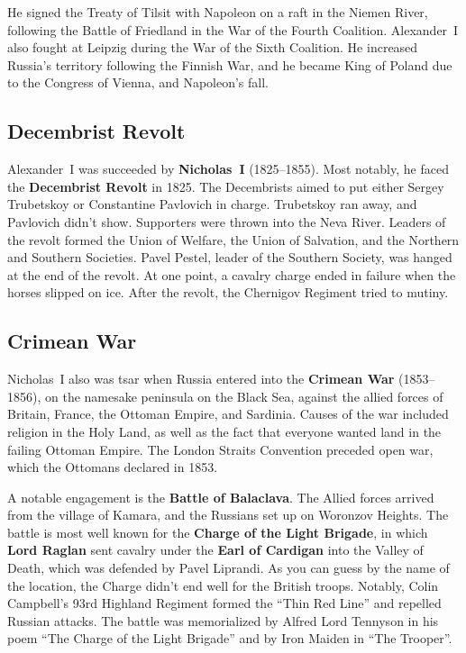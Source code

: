 He signed the Treaty of Tilsit with Napoleon on a raft in the Niemen River,
following the Battle of Friedland in the War of the Fourth Coalition.
Alexander~I also fought at Leipzig during the War of the Sixth Coalition.
He increased Russia's territory following the Finnish War,
and he became King of Poland due to the Congress of Vienna, and Napoleon's fall.

\subsection*{Decembrist Revolt}

Alexander~I was succeeded by \textbf{Nicholas~I} (1825--1855).
Most notably, he faced the \textbf{Decembrist Revolt} in 1825.
The Decembrists aimed to put either Sergey Trubetskoy or Constantine Pavlovich in charge.
Trubetskoy ran away, and Pavlovich didn't show.
Supporters were thrown into the Neva River.
Leaders of the revolt formed the Union of Welfare, the Union of Salvation, and the Northern and Southern Societies.
Pavel Pestel, leader of the Southern Society, was hanged at the end of the revolt.
At one point, a cavalry charge ended in failure when the horses slipped on ice.
After the revolt, the Chernigov Regiment tried to mutiny.

\subsection*{Crimean War}

Nicholas~I also was tsar when Russia entered into the \textbf{Crimean War} (1853--1856),
on the namesake peninsula on the Black Sea,
against the allied forces of Britain, France, the Ottoman Empire, and Sardinia.
Causes of the war included religion in the Holy Land,
as well as the fact that everyone wanted land in the failing Ottoman Empire.
The London Straits Convention preceded open war, which the Ottomans declared in 1853.

A notable engagement is the \textbf{Battle of Balaclava}.
The Allied forces arrived from the village of Kamara, and the Russians set up on Woronzov Heights.
The battle is most well known for the \textbf{Charge of the Light Brigade},
in which \textbf{Lord Raglan} sent cavalry under the \textbf{Earl of Cardigan} into the Valley of Death,
which was defended by Pavel Liprandi.
As you can guess by the name of the location, the Charge didn't end well for the British troops.
Notably, Colin Campbell's 93rd Highland Regiment formed the ``Thin Red Line'' and repelled Russian attacks.
The battle was memorialized by Alfred Lord Tennyson in his poem ``The Charge of the Light Brigade''
and by Iron Maiden in ``The Trooper''.

